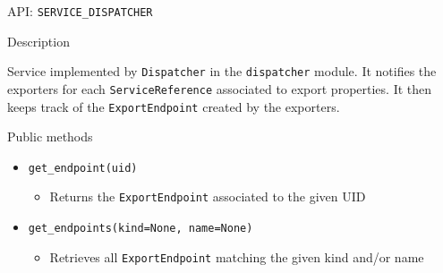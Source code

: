 
\begin{frame}{API: \texttt{SERVICE\_DISPATCHER}}
\begin{block}{Description}
\begin{small}
Service implemented by \texttt{Dispatcher} in the \texttt{dispatcher} module.
It notifies the exporters for each \texttt{ServiceReference} associated to export properties.
It then keeps track of the \texttt{ExportEndpoint} created by the exporters.
\end{small}
\end{block}

\begin{block}{Public methods}
\begin{small}
\begin{itemize}
\item[] \texttt{get\_endpoint(uid)}
\begin{itemize}
\vspace{-.2em}
\item[] Returns the \texttt{ExportEndpoint} associated to the given UID
\end{itemize}
\item[] \texttt{get\_endpoints(kind=None, name=None)}
\begin{itemize}
\vspace{-.2em}
\item[] Retrieves all \texttt{ExportEndpoint} matching the given kind and/or name
\end{itemize}
\end{itemize}
\end{small}
\end{block}
\end{frame}

